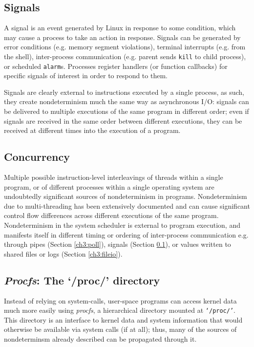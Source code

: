\subsection{Signals}\label{ch3:sig}
A signal is an event generated by Linux
in response to some condition, which may cause
a process to take an action in response.
Signals can be generated by error conditions
(e.g. memory segment violations), 
terminal interrupts (e.g. from the shell), 
inter-process communication (e.g. parent 
sends \texttt{kill} to child process),
or scheduled \texttt{alarm}s. 
Processes register handlers (or function callbacks) for specific signals
of interest in order to respond to them.

Signals are clearly external to
instructions executed by a single process,
as such, they create nondeterminism 
much the same way as asynchronous I/O:
signals can be delivered to multiple executions
of the same program in different order; 
even if signals are received in the
same order between different executions,
they can be received at different times
into the execution of a program.

\subsection{Concurrency} \label{ch3:concurrency}
Multiple possible instruction-level interleavings of 
threads within a single program, 
or of different processes within 
a single operating system are
undoubtedly significant sources
of nondeterminism in programs.
Nondeterminism due to
multi-threading has been extensively
documented and can cause
significant control flow differences
across different executions of the same
program.
\newpage
Nondeterminism in the system
scheduler is external to 
program execution, and manifests itself
in different timing or ordering of
inter-process communication e.g.
through pipes (Section \ref{ch3:poll}), signals (Section \ref{ch3:sig}), or 
values written to shared files or logs (Section \ref{ch3:fileio}).

\subsection{{\em Procfs}: The `/proc/' directory}\label{ch3:procfs}
Instead of relying on system-calls, user-space programs
can access kernel data much more easily using {\em procfs}, a hierarchical 
directory mounted at \texttt{`/proc/'}.
This directory is an interface
to kernel data and system information
that would otherwise be available
via system calls (if at all);
thus, many of the sources of nondeterminsm
already described can be propagated
through it.

